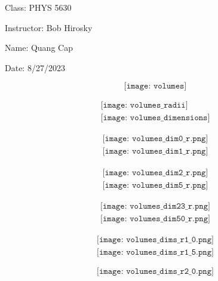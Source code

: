 \documentclass{article}
\begin{document}
    
Class: PHYS 5630

Instructor: Bob Hirosky

Name: Quang Cap

Date: 8/27/2023

\begin{center}
\end{center}

\[
    \texttt{[image: volumes]}
\]

\begin{align*}
    \texttt{[image: volumes\_radii]} \\
    \texttt{[image: volumes\_dimensions]}
\end{align*}

\begin{align*}
    \texttt{[image: volumes\_dim0\_r.png]} \\
    \texttt{[image: volumes\_dim1\_r.png]}
\end{align*}

\begin{align*}
    \texttt{[image: volumes\_dim2\_r.png]} \\
    \texttt{[image: volumes\_dim5\_r.png]}
\end{align*}

\begin{align*}
    \texttt{[image: volumes\_dim23\_r.png]} \\
    \texttt{[image: volumes\_dim50\_r.png]}
\end{align*}

\begin{align*}
    \texttt{[image: volumes\_dims\_r1\_0.png]} \\
    \texttt{[image: volumes\_dims\_r1\_5.png]}
\end{align*}

\[
    \texttt{[image: volumes\_dims\_r2\_0.png]}
\]
\end{document}
